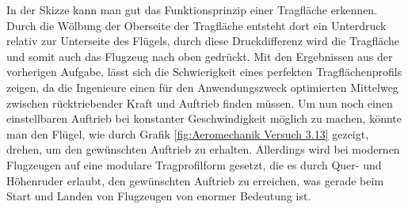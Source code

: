 In der Skizze kann man gut das Funktionsprinzip einer Tragfläche erkennen. Durch die Wölbung der Oberseite der Tragfläche entsteht dort ein Unterdruck relativ zur Unterseite des Flügels, durch diese Druckdifferenz wird die Tragfläche und somit auch das Flugzeug nach oben gedrückt. Mit den Ergebnissen aus der vorherigen Aufgabe, lässt sich die Schwierigkeit eines perfekten Tragflächenprofils zeigen, da die Ingenieure einen für den Anwendungszweck optimierten Mittelweg zwischen rücktriebender Kraft und Auftrieb finden müssen. Um nun noch einen einstellbaren Auftrieb bei konstanter Geschwindigkeit möglich zu machen, könnte man den Flügel, wie durch Grafik \ref{fig:Aeromechanik Versuch 3.13} gezeigt, drehen, um den gewünschten Auftrieb zu erhalten. Allerdings wird bei modernen Flugzeugen auf eine modulare Tragprofilform gesetzt, die es durch Quer- und Höhenruder erlaubt, den gewünschten Auftrieb zu erreichen, was gerade beim Start und Landen von Flugzeugen von enormer Bedeutung ist.

